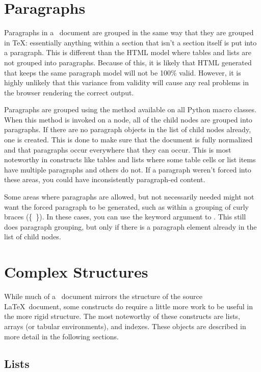 \section{Paragraphs\label{sec:paragraphs}}

Paragraphs in a \plasTeX\ document are grouped in the same way that they
are grouped in \TeX: essentially anything within a section that isn't a
section itself is put into a paragraph.  This is different than the HTML
model where tables and lists are not grouped into paragraphs.  Because
of this, it is likely that HTML generated that keeps the same paragraph
model will not be 100\% valid.  However, it is highly unlikely that this 
variance from validity will cause any real problems in the browser 
rendering the correct output.

Paragraphs are grouped using the  method available on
all Python macro classes.  When this method is invoked on a node, 
all of the child nodes are grouped into paragraphs.  If there are no
paragraph objects in the list of child nodes already, one is created.
This is done to make sure that the document is fully normalized and 
that paragraphs occur everywhere that they can occur.  This is
most noteworthy in constructs like tables and lists where some table cells
or list items have multiple paragraphs and others do not.  If a paragraph
weren't forced into these areas, you could have inconsistently 
paragraph-ed content.

Some areas where paragraphs are allowed, but not necessarily needed might
not want the forced paragraph to be generated, such as within a grouping
of curly braces (\{~\}).  In these cases, you can
use the  keyword argument to .
This still does paragraph grouping, but only if there is a paragraph element
already in the list of child nodes.


\section{Complex Structures\label{sec:complexdoc}}

While much of a \plasTeX\ document mirrors the structure of the source
\LaTeX\ document, some constructs do require a little more work to be
useful in the more rigid structure.  The most noteworthy of these 
constructs are lists, arrays (or tabular environments), and indexes.  
These objects are described in more detail in the following sections.


\subsection{Lists\label{sec:lists}}

